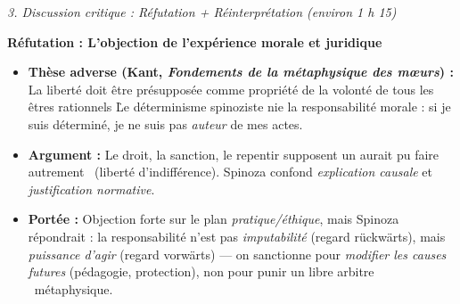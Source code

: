 \documentclass[11pt]{article}
\newcommand{\cle}[1]{{\popxbold\color{popdark}#1}}
\begin{document}
\begin{exoresolu}
\emph{3. Discussion critique : Réfutation + Réinterprétation (environ 1 h 15)}

\textbf{Réfutation : L'objection de l'expérience morale et juridique}
\begin{itemize}
    \item \textbf{Thèse adverse (Kant, \emph{Fondements de la métaphysique des mœurs}) :} \guillemotleft La liberté doit être présupposée comme propriété de la volonté de tous les êtres rationnels \guillemotright\. Le déterminisme spinoziste nie la \cle{responsabilité morale} : si je suis déterminé, je ne suis pas \emph{auteur} de mes actes.
    \item \textbf{Argument :} Le droit, la sanction, le repentir supposent un \guillemotleft aurait pu faire autrement \guillemotright\ (liberté d'indifférence). Spinoza confond \emph{explication causale} et \emph{justification normative}.
    \item \textbf{Portée :} Objection forte sur le plan \emph{pratique/éthique}, mais Spinoza répondrait : la responsabilité n'est pas \emph{imputabilité} (regard rückwärts), mais \emph{puissance d'agir} (regard vorwärts) — on sanctionne pour \emph{modifier les causes futures} (pédagogie, protection), non pour punir un \guillemotleft libre arbitre \guillemotright\ métaphysique.
\end{itemize}


\end{exoresolu}
\end{document}
